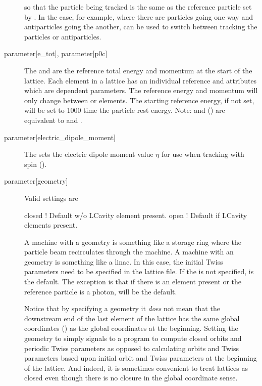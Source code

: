 \begin{description}
so that the particle being tracked is the same as the reference
particle set by . In the case, for example,
where there are particles going one way and antiparticles going the another,
 can be used to switch between
tracking the particles or antiparticles.
  \item[{parameter[e_tot], parameter[p0c]}] \Newline
The  and  are the reference
total energy and momentum at the start of the lattice. Each element
in a lattice has an individual reference  and  attributes
which are dependent parameters. The reference energy and momentum will only
change between  or  elements. The starting
reference energy, if not set, will be set to 1000 time the particle
rest energy.  Note:  and  () are
equivalent to  and .
  \item[{parameter[electric_dipole_moment]}] \Newline
The  sets the electric dipole moment value $\eta$ for use
when tracking with spin (). 
  \item[{parameter[geometry]}] \Newline
Valid  settings are
\begin{example}
  closed  ! Default w/o LCavity element present.
  open    ! Default if LCavity elements present.
\end{example}
A machine with a  geometry is something like a storage ring
where the particle beam recirculates through the machine.  A machine
with an  geometry is something like a linac.  In this case,
the initial Twiss parameters need to be specified in the lattice
file. If the  is not specified,  is the
default. The exception is that if there is an  element
present or the reference particle is a photon,  will be the
default.

Notice that by specifying a  geometry it {\em does} not
mean that the downstream end of the last element of the lattice has
the same global coordinates () as the global
coordinates at the beginning. Setting the geometry to 
simply signals to a program to compute closed orbits and periodic
Twiss parameters as opposed to calculating orbits and Twiss parameters
based upon initial orbit and Twiss parameters at the beginning of the
lattice. And indeed, it is sometimes convenient to treat lattices as
closed even though there is no closure in the global coordinate sense.


\end{description}
